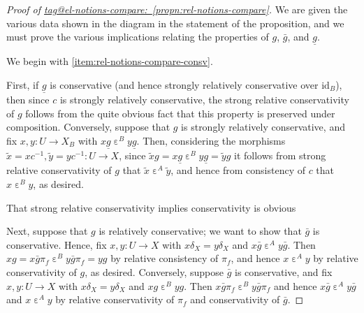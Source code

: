 \documentclass{amsart}
\makeatletter
\newcommand\ein{\mathrel{\varepsilon}}
\newcommand\id{\mathrm{id}}
\newcommand\I{^{-1}}
\newcommand\und[1]{\underline{#1}}
\newcommand\tagword[1]{\csname tag@#1\endcsname}
\def\label@tag#1:#2\@nil{#1}
\newcommand\labeltag[1]{\label@tag#1:\@nil}
\newcommand\jref[1]{%
  \texorpdfstring%
    {\hyperref[#1]{\tagword{\labeltag{#1}}~\ref*{#1}}}%
    {\tagword{\labeltag{#1}}~\ref*{#1}}%
}
\theoremstyle{definition}
\theoremstyle{remark}
\theoremstyle{plainwithref}
\makeatother
\begin{document}
\begin{proof}[Proof of \jref{propn:rel-notions-compare}] \label{proof:rel-notions-compare}
  We are given the various data shown in the diagram in the statement of the proposition, and we must prove the various implications relating the properties of \( g \), \( \bar g \), and \( \und g \).

  We begin with \ref{item:rel-notions-compare-consv}.

  First, if \( \und g \) is conservative (and hence strongly relatively conservative over \( \id_B \)), then since \( c \) is strongly relatively conservative, the strong relative conservativity of \( g \) follows from the quite obvious fact that this property is preserved under composition.
  Conversely, suppose that \( g \) is strongly relatively conservative, and fix \( x,y \colon U \to X_B \) with \( x \und g \ein^B y \und g \).
  Then, considering the morphisms \( \tilde x = x c \I, \tilde y = y c \I \colon U \to X \), since \( \tilde x g = x \und g \ein^B y \und g = \tilde y g \) it follows from strong relative conservativity of \( g \) that \( \tilde x \ein^A \tilde y \), and hence from consistency of \( c \) that \( x \ein^B y \), as desired.

  That strong relative conservativity implies conservativity is obvious

  Next, suppose that \( g \) is relatively conservative; we want to show that \( \bar g \) is conservative.
  Hence, fix \( x,y \colon U \to X \) with \( x \delta_X = y \delta_X \) and \( x \bar g \ein^A y \bar g \).
  Then \( x g = x \bar g \pi_f \ein^B y \bar g \pi_f = y g \) by relative consistency of \( \pi_f \), and hence \( x \ein^A y \) by relative conservativity of \( g \), as desired.
  Conversely, suppose \( \bar g \) is conservative, and fix \( x,y \colon U \to X \) with \( x \delta_X = y \delta_X \) and \( x g \ein^B y g \).
  Then \( x \bar g \pi_f \ein^B y \bar g \pi_f \) and hence \( x \bar g \ein^A y \bar g \) and \( x \ein^A y \) by relative conservativity of \( \pi_f \) and conservativity of \( \bar g \).


\end{proof}
\end{document}
